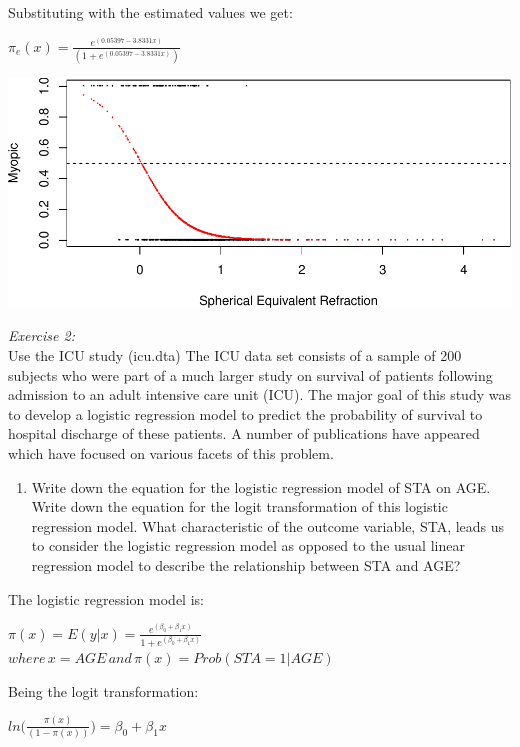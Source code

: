 \documentclass[]{article}
\begin{document}
Substituting with the estimated values we get:

$\pi_{e}(x)=\frac{e^{(0.05397-3.8331x)}}{(1+e^{(0.05397-3.8331x)})}$

\begin{center}\includegraphics{HomeworkWeek1_files/figure-latex/unnamed-chunk-3-1} \end{center}

\emph{Exercise 2:}\\Use the ICU study (icu.dta) The ICU data set
consists of a sample of 200 subjects who were part of a much larger
study on survival of patients following admission to an adult intensive
care unit (ICU). The major goal of this study was to develop a logistic
regression model to predict the probability of survival to hospital
discharge of these patients. A number of publications have appeared
which have focused on various facets of this problem.

\begin{enumerate}
\def\labelenumi{\alph{enumi}.}
\itemsep1pt\parskip0pt
\item
  Write down the equation for the logistic regression model of STA on
  AGE. Write down the equation for the logit transformation of this
  logistic regression model. What characteristic of the outcome
  variable, STA, leads us to consider the logistic regression model as
  opposed to the usual linear regression model to describe the
  relationship between STA and AGE?
\end{enumerate}

The logistic regression model is:

$\pi(x)=E(y|x)=\frac{e^{(\beta_0+\beta_1x)}}{1+e^{(\beta_0+\beta_1x)}}$
$where\,x=AGE\,and\,\pi(x)= Prob(STA=1|AGE)$

Being the logit transformation:

$ln\bigg(\frac{\pi(x)}{(1-\pi(x))}\bigg)=\beta_0+\beta_1x$
\end{document}
